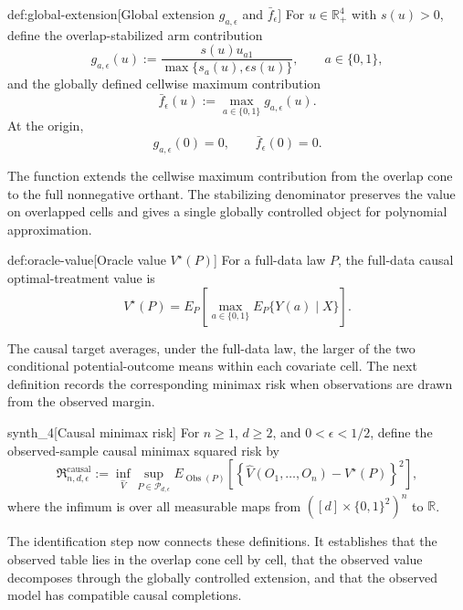 \begin{definitionv}{def:global-extension}[Global extension \(g_{a,\epsilon}\) and \(\bar f_\epsilon\)]
For \(u\in\mathbb R_+^4\) with \(s(u)>0\), define the overlap-stabilized arm contribution
\[
g_{a,\epsilon}(u)
:=
\frac{s(u)u_{a1}}{\max\{s_a(u),\epsilon s(u)\}},
\qquad a\in\{0,1\},
\]
and the globally defined cellwise maximum contribution
\[
\bar f_\epsilon(u)
:=
\max_{a\in\{0,1\}} g_{a,\epsilon}(u).
\]
At the origin,
\[
g_{a,\epsilon}(0)=0,
\qquad
\bar f_\epsilon(0)=0.
\]
\end{definitionv}

The function  extends the cellwise maximum contribution from the overlap cone to the full nonnegative orthant. The stabilizing denominator preserves the value on overlapped cells and gives a single globally controlled object for polynomial approximation.

\begin{definitionv}{def:oracle-value}[Oracle value \(V^\star(P)\)]
For a full-data law \(P\), the full-data causal optimal-treatment value is
\[
V^\star(P)
=
E_P\!\left[
\max_{a\in\{0,1\}}
E_P\{Y(a)\mid X\}
\right].
\]
\end{definitionv}

The causal target  averages, under the full-data law, the larger of the two conditional potential-outcome means within each covariate cell. The next definition records the corresponding minimax risk when observations are drawn from the observed margin.

\begin{definitionv}{synth_4}[Causal minimax risk]
For \(n\ge1\), \(d\ge2\), and \(0<\epsilon<1/2\), define the observed-sample causal minimax squared risk by \[ \mathfrak R^{\mathrm{causal}}_{n,d,\epsilon}:=\inf_{\widehat V}\sup_{P\in\mathcal P_{d,\epsilon}} E_{\operatorname{Obs}(P)}\left[\left\{\widehat V(O_1,\ldots,O_n)-V^\star(P)\right\}^2\right], \] where the infimum is over all measurable maps from \(([d]\times\{0,1\}^2)^n\) to \(\mathbb R\).
\end{definitionv}

The identification step now connects these definitions. It establishes that the observed table lies in the overlap cone cell by cell, that the observed value decomposes through the globally controlled extension, and that the observed model has compatible causal completions.

